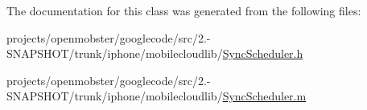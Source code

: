\-The documentation for this class was generated from the following files\-:\begin{DoxyCompactItemize}
\item 
projects/openmobster/googlecode/src/2.-\/\-S\-N\-A\-P\-S\-H\-O\-T/trunk/iphone/mobilecloudlib/\hyperlink{_sync_scheduler_8h}{\-Sync\-Scheduler.\-h}\item 
projects/openmobster/googlecode/src/2.-\/\-S\-N\-A\-P\-S\-H\-O\-T/trunk/iphone/mobilecloudlib/\hyperlink{_sync_scheduler_8m}{\-Sync\-Scheduler.\-m}\end{DoxyCompactItemize}

